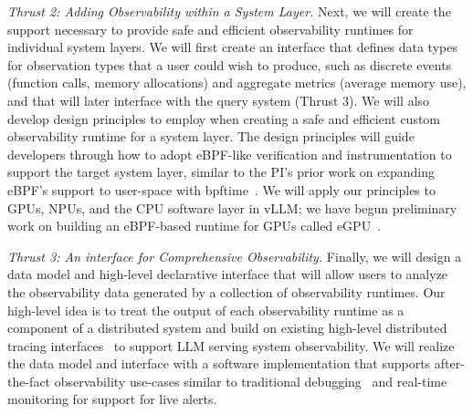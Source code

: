 
\textit{Thrust 2: Adding Observability within a System Layer.}  Next, we will create the support necessary to provide safe and efficient observability runtimes for individual system layers.  We will first create an interface that defines data types for observation types that a user could wish to produce, such as discrete events (\eg function calls, memory allocations) and aggregate metrics (\eg average memory use), and that will later interface with the query system (Thrust 3).  We will also develop design principles to employ when creating a safe and efficient custom observability runtime for a system layer.  The design principles will guide  developers through how to adopt eBPF-like verification and instrumentation to support the target system layer, similar to the PI's prior work on expanding eBPF's support to user-space with bpftime~\cite{zheng2025extending}.  We will apply our principles to GPUs, NPUs, and the CPU software layer in vLLM; we have begun preliminary work on building an eBPF-based runtime for GPUs called eGPU~\cite{yang2025egpu}.



\textit{Thrust 3: An interface for Comprehensive Observability.} Finally, we will design a data model and high-level declarative interface that will allow users to analyze the observability data generated by a collection of observability runtimes.  Our high-level idea is to treat the output of each observability runtime as a component of a distributed system and build on existing high-level distributed tracing interfaces~\cite{fonseca2007xtrace,Mace_2015_pivottracing} to support LLM serving system observability.  We will realize the data model and interface with a software implementation that supports after-the-fact observability use-cases similar to traditional debugging~\cite{Quinn_2022_omnitable} and real-time monitoring for support for live alerts. 

